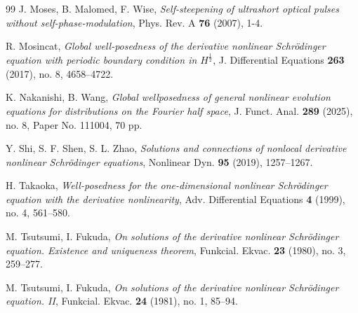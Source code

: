 \documentclass[%
11pt,  reqno]{amsart}
\numberwithin{equation}{section}
\numberwithin{theorem}{section}
\begin{document}
\begin{thebibliography}{99}
J. Moses, B. Malomed, F. Wise, 
{\it Self-steepening of ultrashort optical pulses without self-phase-modulation},
Phys. Rev. A \textbf{76} (2007), 1-4.

R. Mosincat,
{\it Global well-posedness of the derivative nonlinear Schr\"odinger equation with periodic boundary condition in $H^{\frac12}$},
J. Differential Equations \textbf{263} (2017), no. 8, 4658–4722.

K. Nakanishi, B. Wang,
{\it Global wellposedness of general nonlinear evolution equations for distributions on the Fourier half space},
J. Funct. Anal. \textbf{289} (2025), no. 8, Paper No. 111004, 70 pp.


Y. Shi, S. F. Shen, S. L. Zhao,
{\it Solutions and connections of nonlocal derivative nonlinear Schr\"odinger equations}, 
Nonlinear Dyn. \textbf{95} (2019), 1257–1267.

H. Takaoka,
{\it Well-posedness for the one-dimensional nonlinear Schr\"odinger equation with the derivative nonlinearity},
Adv. Differential Equations \textbf{4} (1999), no. 4, 561–580.


M. Tsutsumi, I. Fukuda,
{\it On solutions of the derivative nonlinear Schr\"odinger equation. Existence and uniqueness theorem},
Funkcial. Ekvac. \textbf{23} (1980), no. 3, 259–277.

M. Tsutsumi, I. Fukuda,
{\it On solutions of the derivative nonlinear Schr\"odinger equation. II},
Funkcial. Ekvac. \textbf{24} (1981), no. 1, 85–94.
\end{thebibliography}
\end{document}
